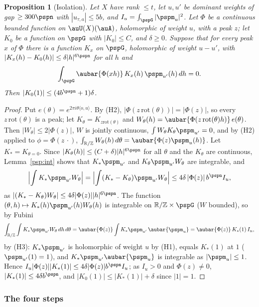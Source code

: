 \documentclass[10pt]{amsart}
\newtheorem{proposition}[theorem]{Proposition}
\theoremstyle{definition}
\theoremstyle{remark}
\newcommand{\R}{\mathbb R}
\newcommand{\Z}{\mathbb Z}
\begin{document}
\begin{proposition}[Isolation]\label{psp:isol}
Let $X$ have rank $\le t$, let $u,u'$ be dominant weights of gap $\ge300\pspn$ with $|u_{\tau,a}|\le5b$,
and $I_u=\int_{\pspG}|\pspm_u|^2$. Let $\Phi$ be a continuous bounded function on $\auU(X)(\auA)$,
holomorphic of weight $u$, with a peak $z$; let $K_0$ be a function on $\pspG$ with $|K_0|\le C$, and
$\delta\ge0$. Suppose that for every peak $x$ of $\Phi$ there is a function $K_x$ on $\pspG$,
holomorphic of weight $u-u'$, with $|K_x(h)-K_0(h)|\le\delta|h|^{6\pspn}$ for all $h$ and
\[
\int_{\pspG}\aubar{\Phi(xh)}\,K_x(h)\,\pspm_{u'}(h)\,dh=0 .
\]
Then $|K_0(1)|\le(4b^{\pspn}+1)\delta$.
\end{proposition}
\begin{proof}
Put $e(\theta)=e^{2\pi i\theta\langle o,u\rangle}$. By (H2), $|\Phi(z\,\mathrm{rot}(\theta))|=|\Phi(z)|$,
so every $z\,\mathrm{rot}(\theta)$ is a peak; let $K_\theta=K_{z\mathrm{rot}(\theta)}$ and
$W_\theta(h)=\aubar{\Phi(z\,\mathrm{rot}(\theta)h)}\,e(\theta)$. Then $|W_\theta|\le2|\Phi(z)|$, $W$ is
jointly continuous, $\int W_\theta K_\theta\pspm_{u'}=0$, and by (H2) applied to $\phi=\Phi(z\,\cdot)$,
$\int_{\R/\Z}W_\theta(h)\,d\theta=\aubar{\Phi(z)\pspm_u(h)}$. Let $K_*=K_{\theta=0}$. Since
$|K_\theta(h)|\le(C+\delta)|h|^{6\pspn}$ for all $\theta$ and the $K_\theta$ are continuous,
Lemma~\ref{psp:int} shows that $K_*\pspm_{u'}$ and $K_\theta\pspm_{u'}W_\theta$ are integrable, and
\[
\Bigl|\int K_*\pspm_{u'}W_\theta\Bigr|=\Bigl|\int(K_*-K_\theta)\pspm_{u'}W_\theta\Bigr|\le
4\delta\,|\Phi(z)|\,b^{\pspn}I_u ,
\]
as $|(K_*-K_\theta)W_\theta|\le4\delta|\Phi(z)||h|^{6\pspn}$. The function $(\theta,h)\mapsto
K_*(h)\pspm_{u'}(h)W_\theta(h)$ is integrable on $\R/\Z\times\pspG$ ($W$ bounded), so by Fubini
\[
\int_{\R/\Z}\int K_*\pspm_{u'}W_\theta\,dh\,d\theta=\aubar{\Phi(z)}\int K_*\pspm_{u'}\,\aubar{\pspm_u}
=\aubar{\Phi(z)}\,K_*(1)\,I_u ,
\]
by (H3): $K_*\pspm_{u'}$ is holomorphic of weight $u$ by (H1), equals $K_*(1)$ at $1$
($\pspm_{u'}(1)=1$), and $K_*\pspm_{u'}\aubar{\pspm_u}$ is integrable as $|\pspm_u|\le1$. Hence
$I_u|\Phi(z)||K_*(1)|\le4\delta|\Phi(z)|b^{\pspn}I_u$; as $I_u>0$ and $\Phi(z)\ne0$,
$|K_*(1)|\le4\delta b^{\pspn}$, and $|K_0(1)|\le|K_*(1)|+\delta$ since $|1|=1$.
\end{proof}

\subsubsection{The four steps}\label{psp:ss-outline}
\end{document}
